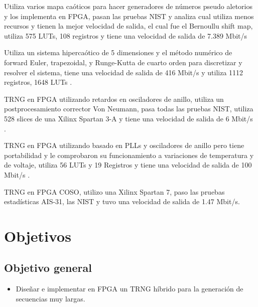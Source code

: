    Utiliza varios mapa caóticos para hacer generadores de números pseudo aletorios y los implementa en FPGA, pasan las pruebas NIST y analiza cual utiliza menos recursos y tienen la mejor velocidad de salida, el cual fue el Bernoullu shift map, utiliza 575 LUTs, 108 registros y tiene una velocidad de salida de 7.389 Mbit/s   \cite{Fraga2017}

   

   Utiliza un sistema hipercaótico de 5 dimensiones y el método numérico de forward Euler, trapezoidal, y Runge-Kutta de cuarto orden para discretizar y resolver el sistema, tiene una velocidad de salida de 416 Mbit/s y utiliza 1112 registros, 1648 LUTs  \cite{Vaidyanathan2021}.
   

   TRNG en FPGA utilizando retardos en osciladores de anillo, utiliza un postprocesamiento corrector Von Neumann, pasa todas las pruebas NIST, utiliza 528 slices de una Xilinx Spartan 3-A y tiene una velocidad de salida de 6 Mbit/s \cite{Anandakumar2020}.

   

   TRNG en FPGA utilizando basado en PLLs y osciladores de anillo pero tiene portabilidad y le comprobaron su funcionamiento a variaciones de temperatura y de voltaje, utiliza 56 LUTs y 19 Registros y tiene una velocidad de salida de 100 Mbit/s \cite{Wang2021}.

    

    TRNG en FPGA COSO, utilizo una Xilinx Spartan 7, paso las pruebas estadísticas AIS-31, las NIST y tuvo una velocidad de salida de 1.47 Mbit/s. \cite{Peetermans2021}





	\section{Objetivos}
	
		\subsection{Objetivo general}
			\begin{itemize}
				\item Diseñar e implementar en FPGA un TRNG híbrido para la generación de secuencias muy largas.
			\end{itemize}
		

